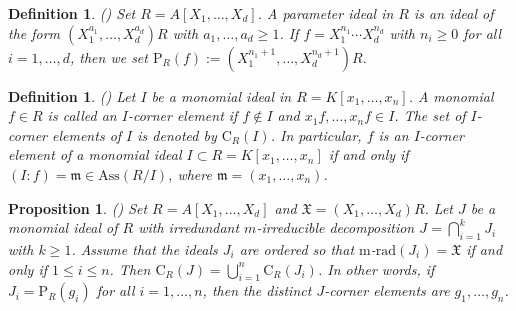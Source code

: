 \documentclass[11pt]{amsart}
\newtheorem{proposition}[theorem]{Proposition}
\newtheorem{definition}[theorem]{Definition}
\begin{document}
\begin{definition} (\cite[Definition 6.1.1]{MRS}) \label{Def. parameter ideal}
\em{
Set  $R = A[X_1,\ldots,X_d]$. A \textit{parameter ideal}  in $R$ is an ideal of the form $(X^{a_1}_1 , \ldots, X^{a_d}_d)R$ 
 with $a_1,  \ldots, a_d \geq 1$.  If  $f = X^{n_1}_1 \cdots  X^{n_d}_d$ with $n_i\geq 0$ for all $i=1, \ldots, d$, then we set
$\mathrm{P}_R( f) := (X^{n_1+1}_1 , \ldots, X^{n_d+1}_d)R.$  
}
\end{definition}





\begin{definition} (\cite[Definition 6.2.1]{MRS}) \label{Def. Corner elements}
\em{
Let $I$ be a monomial ideal in $R=K[x_1, \ldots, x_n]$. A monomial $f\in R$  is called an \textit{$I$-corner element} if $f\notin I$  and 
$x_1f, \ldots, x_nf \in I$.  The set of  $I$-corner elements of $I$  is denoted by $\mathrm{C}_R(I)$.
In particular,  $f$ is an $I$-corner element  of a monomial ideal $I \subset R=K[x_1, \ldots, x_n]$ if and only if $(I:f)=\mathfrak{m}\in \mathrm{Ass}(R/I)$, 
where $\mathfrak{m}=(x_1, \ldots, x_n)$.  
}
\end{definition}




\begin{proposition} (\cite[Proposition 6.2.17]{MRS}) \label{Pro.Parametric}
 Set $R = A[X_1, \ldots, X_d]$ and $\mathfrak{X} = (X_1, \ldots, X_d)R$. Let $J$ be a monomial ideal of $R$ with irredundant $m$-irreducible
  decomposition  $J =\bigcap_{i=1}^k J_i$ with $k \geq 1$.  Assume that the ideals $J_i$ are ordered so that 
  $\mathrm{m}$-$\mathrm{rad}(J_i) =\mathfrak{X}$    if and only if  $1\leq i \leq n$.  Then $\mathrm{C}_R(J)=\bigcup_{i=1}^n \mathrm{C}_R(J_i)$. In other words, if
    $J_i =\mathrm{P}_R(g_i)$ for all  $i=1, \ldots, n$, then the 
  distinct $J$-corner elements are $g_1, \ldots, g_n$. 
\end{proposition}



\end{document}
